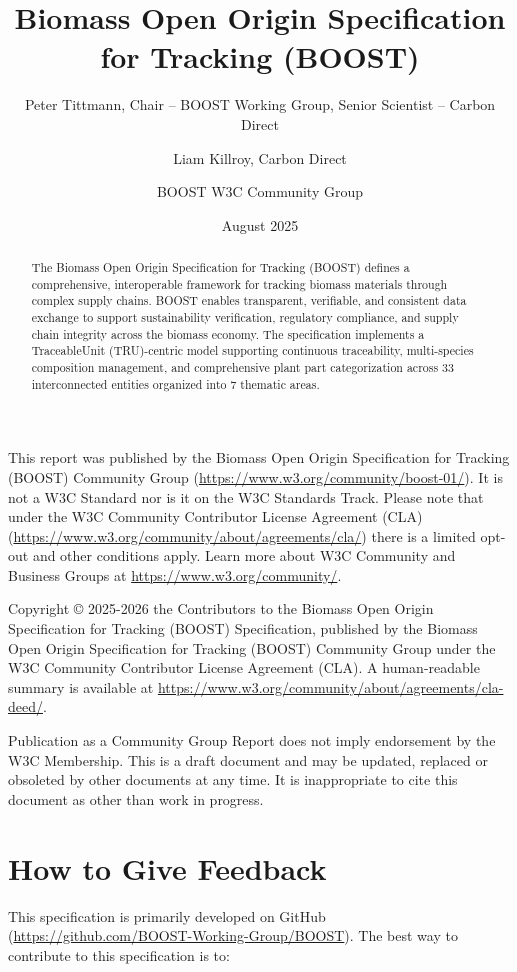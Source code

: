 \documentclass{article}
\title{Biomass Open Origin Specification for Tracking (BOOST)}
\author{Peter Tittmann, Chair -- BOOST Working Group, Senior Scientist -- Carbon Direct \and Liam Killroy, Carbon Direct \and BOOST W3C Community Group}
\date{August 2025}
\begin{document}

\boosttitle


\newpage
{}

\begin{abstract}
The Biomass Open Origin Specification for Tracking (BOOST) defines a comprehensive, interoperable framework for tracking biomass materials through complex supply chains. BOOST enables transparent, verifiable, and consistent data exchange to support sustainability verification, regulatory compliance, and supply chain integrity across the biomass economy. The specification implements a TraceableUnit (TRU)-centric model supporting continuous traceability, multi-species composition management, and comprehensive plant part categorization across 33 interconnected entities organized into 7 thematic areas.
\end{abstract}

\begin{w3cstatus}
This report was published by the Biomass Open Origin Specification for Tracking (BOOST) Community Group (\url{https://www.w3.org/community/boost-01/}). It is not a W3C Standard nor is it on the W3C Standards Track. Please note that under the W3C Community Contributor License Agreement (CLA) (\url{https://www.w3.org/community/about/agreements/cla/}) there is a limited opt-out and other conditions apply. Learn more about W3C Community and Business Groups at \url{https://www.w3.org/community/}.

Copyright \copyright{} 2025-2026 the Contributors to the Biomass Open Origin Specification for Tracking (BOOST) Specification, published by the Biomass Open Origin Specification for Tracking (BOOST) Community Group under the W3C Community Contributor License Agreement (CLA). A human-readable summary is available at \url{https://www.w3.org/community/about/agreements/cla-deed/}.

Publication as a Community Group Report does not imply endorsement by the W3C Membership. This is a draft document and may be updated, replaced or obsoleted by other documents at any time. It is inappropriate to cite this document as other than work in progress.
\end{w3cstatus}

\section*{How to Give Feedback}
This specification is primarily developed on GitHub (\url{https://github.com/BOOST-Working-Group/BOOST}). The best way to contribute to this specification is to:
\end{document}
